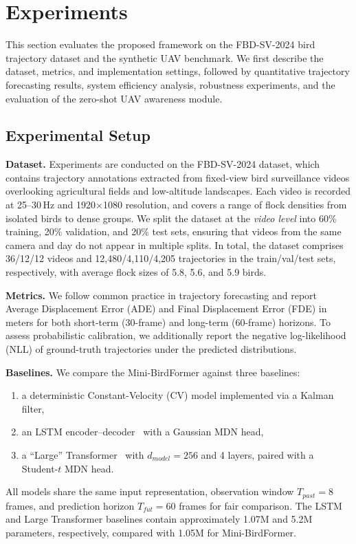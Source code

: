 \documentclass[journal]{IEEEtran}
\begin{document}
\section{Experiments}
\label{sec:experiments}

This section evaluates the proposed framework on the FBD-SV-2024 bird trajectory dataset and the synthetic UAV benchmark. We first describe the dataset, metrics, and implementation settings, followed by quantitative trajectory forecasting results, system efficiency analysis, robustness experiments, and the evaluation of the zero-shot UAV awareness module.

\subsection{Experimental Setup}

\textbf{Dataset.}
Experiments are conducted on the FBD-SV-2024 dataset, which contains trajectory annotations extracted from fixed-view bird surveillance videos overlooking agricultural fields and low-altitude landscapes. Each video is recorded at 25--30\,Hz and 1920$\times$1080 resolution, and covers a range of flock densities from isolated birds to dense groups. We split the dataset at the \emph{video level} into 60\% training, 20\% validation, and 20\% test sets, ensuring that videos from the same camera and day do not appear in multiple splits. In total, the dataset comprises 36/12/12 videos and 12{,}480/4{,}110/4{,}205 trajectories in the train/val/test sets, respectively, with average flock sizes of 5.8, 5.6, and 5.9 birds.

\textbf{Metrics.}
We follow common practice in trajectory forecasting and report Average Displacement Error (ADE) and Final Displacement Error (FDE) in meters for both short-term (30-frame) and long-term (60-frame) horizons. To assess probabilistic calibration, we additionally report the negative log-likelihood (NLL) of ground-truth trajectories under the predicted distributions.

\textbf{Baselines.}
We compare the Mini-BirdFormer against three baselines:
\begin{enumerate}
	\item a deterministic Constant-Velocity (CV) model implemented via a Kalman filter,
	\item an LSTM encoder--decoder~\cite{Alahi2016SocialLSTM} with a Gaussian MDN head,
	\item a ``Large'' Transformer~\cite{Giuliari2021Transformer} with $d_{model}=256$ and 4 layers, paired with a Student-$t$ MDN head.
\end{enumerate}
All models share the same input representation, observation window $T_{past}=8$ frames, and prediction horizon $T_{fut}=60$ frames for fair comparison. The LSTM and Large Transformer baselines contain approximately 1.07M and 5.2M parameters, respectively, compared with 1.05M for Mini-BirdFormer.
\end{document}
